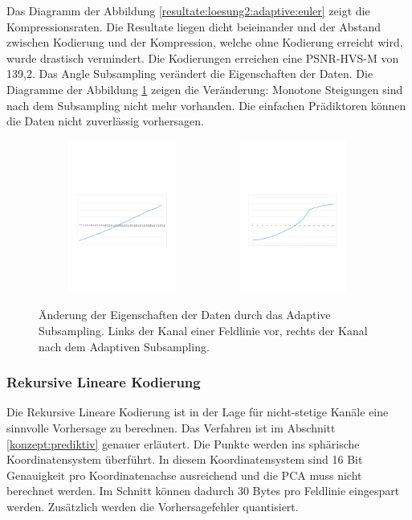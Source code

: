 Das Diagramm der Abbildung \ref{resultate:loesung2:adaptive:euler} zeigt die Kompressionsraten. Die Resultate liegen dicht beieinander und der Abstand zwischen Kodierung und der Kompression, welche ohne Kodierung erreicht wird, wurde drastisch vermindert. Die Kodierungen erreichen eine PSNR-HVS-M von 139,2. Das Angle Subsampling verändert die Eigenschaften der Daten. Die Diagramme der Abbildung \ref{resultate:loesung2:adaptive:channel} zeigen die Veränderung: Monotone Steigungen sind nach dem Subsampling nicht mehr vorhanden. Die einfachen Prädiktoren können die Daten nicht zuverlässig vorhersagen.

\begin{figure}[!htbp]
	\center
	\includegraphics[trim = 1.8cm 9.5cm 1.8cm 11cm, clip=true,
width=0.49\textwidth,height=5cm,keepaspectratio]{./pictures/resultate/loesung2/variante1/channel_euler.pdf}
	\includegraphics[trim = 1.8cm 9.5cm 1.8cm 11cm, clip=true,
width=0.49\textwidth,height=5cm,keepaspectratio]{./pictures/resultate/loesung2/variante1/channel_angle.pdf}
	\caption{Änderung der Eigenschaften der Daten durch das Adaptive Subsampling. Links der Kanal einer Feldlinie vor, rechts der Kanal nach dem Adaptiven Subsampling.}
	\label{resultate:loesung2:adaptive:channel}
\end{figure}

\subsubsection{Rekursive Lineare Kodierung} \label{resultate:loesung2:wavelet}
Die Rekursive Lineare Kodierung ist in der Lage für nicht-stetige Kanäle eine sinnvolle Vorhersage zu berechnen. Das Verfahren ist im Abschnitt \ref{konzept:prediktiv} genauer erläutert. Die Punkte werden ins sphärische Koordinatensystem überführt. In diesem Koordinatensystem sind 16 Bit Genauigkeit pro Koordinatenachse ausreichend und die PCA muss nicht berechnet werden. Im Schnitt können dadurch 30 Bytes pro Feldlinie eingespart werden. Zusätzlich werden die Vorhersagefehler quantisiert.

